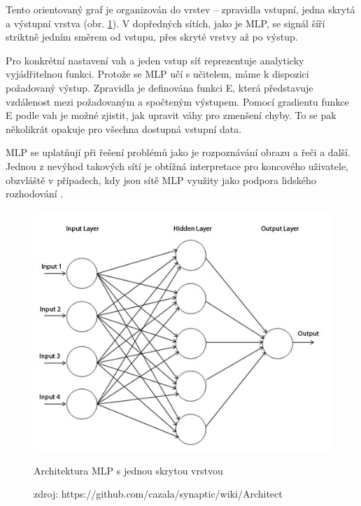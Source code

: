 \documentclass[thesis=M,czech]{FITthesis}[2012/06/26]
\begin{document}
Tento orientovaný graf je organizován do vrstev -- zpravidla vstupní, jedna skrytá a výstupní vrstva (obr. \ref{fig:mlp}). V dopředných sítích, jako je MLP, se signál šíří striktně jedním směrem od vstupu, přes skryté vrstvy až po výstup. 

Pro konkrétní nastavení vah a jeden vstup síť reprezentuje analyticky vyjádřitelnou funkci. Protože se MLP učí s učitelem, máme k dispozici požadovaný výstup. Zpravidla je definována funkci E, která představuje vzdálenost mezi požadovaným a spočteným výstupem. Pomocí gradientu funkce E podle vah je možné zjistit, jak upravit váhy pro zmenšení chyby. To se pak několikrát opakuje pro všechna dostupná vstupní data. 

MLP se uplatňují při řešení problémů jako je rozpoznávání obrazu a řeči a další. Jednou z nevýhod takových sítí je obtížná interpretace pro koncového uživatele, obzvláště v případech, kdy jsou sítě MLP využity jako podpora lidského rozhodování \cite{needed}. 



\begin{figure}[htbp]
\begin{center}
	\includegraphics[scale=0.4]{mlp.jpeg}
\caption{Architektura MLP s jednou skrytou vrstvou}
\label{fig:mlp}
\end{center}
  \caption*{zdroj: https://github.com/cazala/synaptic/wiki/Architect}
\end{figure}
\end{document}
